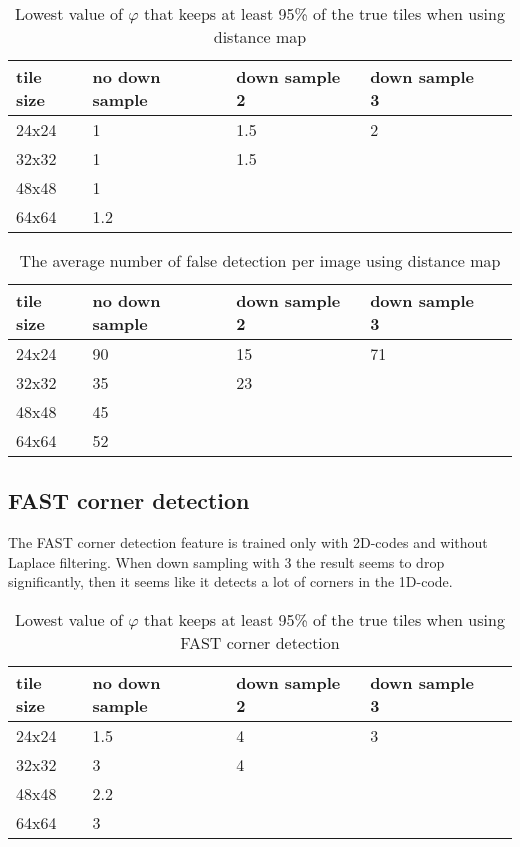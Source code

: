 \begin{table}[H]
\begin{center}
     \begin{tabular}{ | l | l | l | l | l |}
     \hline
     tile size & no down sample & down sample 2 & down sample 3 \\ \hline
   	 24x24 & 1 & 1.5 & 2 		\\ \hline
     32x32 & 1 & 1.5  & 		\\ \hline
     48x48 & 1 &     &  		\\ \hline
     64x64 & 1.2 &     &		\\ \hline
     \end{tabular}
\end{center}
\caption{Lowest value of $\varphi$ that keeps at least 95\% of the true tiles when using distance map}
\end{table}

\begin{table}[H]
\begin{center}
     \begin{tabular}{ | l | l | l | l | l |}
     \hline
     tile size & no down sample & down sample 2 & down sample 3 \\ \hline
   	 24x24 & 90 & 15 & 71 	    \\ \hline
     32x32 & 35 & 23 & 			\\ \hline
     48x48 & 45    &     &  	\\ \hline
     64x64 & 52     &     &		\\ \hline
     \end{tabular}
\end{center}
\caption{The average number of false detection per image using distance map}
\end{table}


\subsection{FAST corner detection}
The FAST corner detection feature is trained only with 2D-codes and without Laplace filtering. When down sampling with 3 the result seems to drop significantly, then it seems like it detects a lot of corners in the 1D-code.

\begin{table}[H]
\begin{center}
     \begin{tabular}{ | l | l | l | l | l |}
     \hline
     tile size & no down sample & down sample 2 & down sample 3 \\ \hline
   	 24x24 & 1.5 & 4 & 3 		\\ \hline
     32x32 & 3 & 4 & 			\\ \hline
     48x48 & 2.2 &     &  		\\ \hline
     64x64 & 3 &     &			\\ \hline
     \end{tabular}
\end{center}
\caption{Lowest value of $\varphi$ that keeps at least 95\% of the true tiles when using FAST corner detection}
\end{table}

